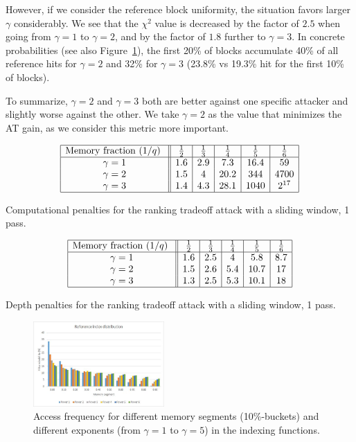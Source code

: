 \documentclass[a4paper]{article}
\begin{document}
However, if we consider the reference block uniformity, the situation favors larger $\gamma$ considerably. We see that the $\chi^2$ value is decreased by the factor of $2.5$ when going from $\gamma=1$ to $\gamma=2$, and by the factor of $1.8$ further to $\gamma=3$. In concrete probabilities (see also Figure~\ref{fig:histo}),
the first 20\% of blocks accumulate 40\% of all reference hits for $\gamma=2$ and 32\% for $\gamma=3$ (23.8\% vs  19.3\% hit for the first 10\% of blocks). 

To summarize, $\gamma=2$ and $\gamma=3$ both are better against one specific attacker and slightly worse against the other. We take $\gamma=2$ as the value that minimizes the AT gain, as we consider this metric more important. 

 \begin{table}[ht]
\renewcommand{\arraystretch}{1.3}
$$
\begin{array}{|c||c|c|c|c|c|}
\hline
\text{Memory fraction ($1/q$) } &\frac{1}{2} &\frac{1}{3} &\frac{1}{4}&\frac{1}{5} &\frac{1}{6}\\
\hline
\gamma=1 & 1.6 & 2.9 & 7.3 & 16.4 & 59\\
\gamma=2 & 1.5 & 4 & 20.2 & 344 & 4700\\
\gamma=3 &1.4& 4.3& 28.1 &1040 & 2^{17}\\
\hline
\end{array}
$$
\caption{Computational penalties for the ranking tradeoff attack with a sliding window, 1 pass.}\label{tab:comp-alpha}
\end{table}

 \begin{table}[ht]
\renewcommand{\arraystretch}{1.3}
$$
\begin{array}{|c||c|c|c|c|c|}
\hline
\text{Memory fraction ($1/q$) } &\frac{1}{2} &\frac{1}{3} &\frac{1}{4}&\frac{1}{5} &\frac{1}{6}\\
\hline
\gamma=1 & 1.6 & 2.5 & 4 & 5.8 & 8.7\\
\gamma=2 & 1.5 & 2.6 & 5.4 & 10.7 & 17\\
\gamma=3 &1.3& 2.5& 5.3 &10.1 & 18\\
\hline
\end{array}
$$
\caption{Depth penalties for the ranking tradeoff attack with a sliding window, 1 pass.}\label{tab:depth-alpha}
\end{table}

\begin{figure}[hb]
\begin{center}
\includegraphics[width=5cm]{pics/power-distribution.jpg}
\end{center}
\caption{Access frequency for different memory segments (10\%-buckets) and different exponents (from $\gamma=1$ to $\gamma=5$) in the indexing functions.}\label{fig:histo}
\end{figure}
\end{document}
